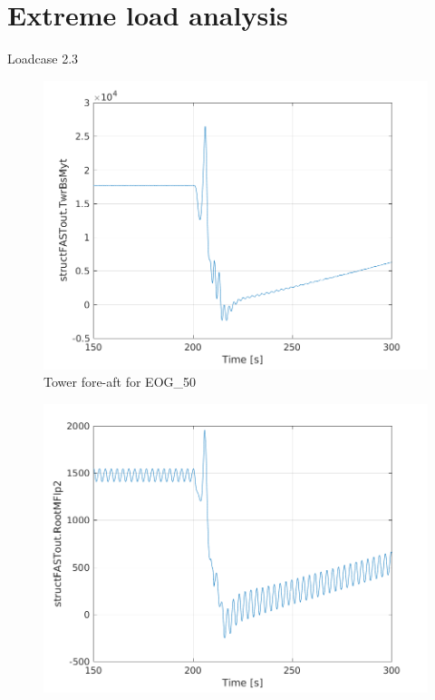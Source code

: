 \documentclass[12pt,t]{beamer}
\begin{document}
\section{Extreme load analysis}
\begin{frame}
\huge
Loadcase 2.3
\begin{figure}[H]
  \centering
\begin{minipage}{0.40\textwidth}
  \includegraphics[width=1\linewidth]{../CIP_6/FASTextreme/EOG_50/TwrBsMyt.png} \\
  \centering
  \footnotesize
   Tower fore-aft for EOG\_50
\end{minipage}
\begin{minipage}{0.40\textwidth}
  \includegraphics[width=1\linewidth]{../CIP_6/FASTextreme/EOG_50/RootMFlp2.png} \\

\end{minipage}
\end{figure}
\end{frame}
\end{document}
